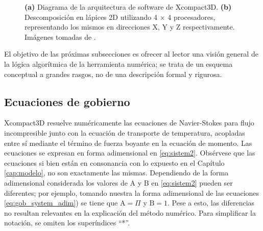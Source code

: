 \begin{figure}[H]
 \centering
    
 \caption{\textbf{(a)} Diagrama de la arquitectura de software de Xcompact3D. \textbf{(b)} Descomposición en lápices 2D utilizando 4 $\times$ 4 procesadores, representando los mismos en direcciones X, Y y Z respectivamente. Imágenes tomadas de \cite{bartholomew2020xcompact3d}.} 
 \label{fig:xc3d}
\end{figure}

El objetivo de las próximas subsecciones es ofrecer al lector una visión general de la lógica algorítmica de la herramienta numérica; se trata de un esquema conceptual a grandes rasgos, no de una descripción formal y rigurosa.

\subsection{Ecuaciones de gobierno}

Xcompact3D resuelve numéricamente las ecuaciones de Navier-Stokes para flujo incompresible junto con la ecuación de transporte de temperatura, acopladas entre sí mediante el término de fuerza boyante en la ecuación de momento. Las ecuaciones se expresan en forma adimensional en \ref{eq:sistem2}. Obsérvese que las ecuaciones si bien están en consonancia con lo expuesto en el Capítulo \ref{cap:modelo}, no son exactamente las mismas. Dependiendo de la forma adimensional considerada los valores de A y B en \ref{eq:sistem2} pueden ser diferentes; por ejemplo, tomando nuestra la forma adimensional de las ecuaciones \ref{eq:gob_system_adim}) se tiene que $\text{A}=\Pi$ y $\text{B}=1$. Pese a esto, las diferencias no resultan relevantes en la explicación del método numérico. Para simplificar la notación, se omiten los superíndices ``*''.

